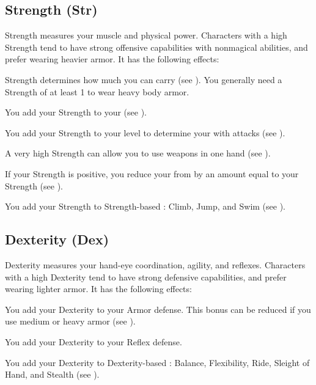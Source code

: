     \subsection{Strength (Str)}\label{Strength}
        {
            Strength measures your muscle and physical power.
            Characters with a high Strength tend to have strong offensive capabilities with nonmagical abilities, and prefer wearing heavier armor.
            It has the following effects:
            \begin{raggeditemize}
                \item Strength determines how much you can carry (see ).
                    You generally need a Strength of at least 1 to wear heavy body armor.
                \item You add your Strength to your  (see ).
                \item You add your Strength to your level to determine your  with  attacks (see ).
                \item A very high Strength can allow you to use  weapons in one hand (see ).
                \item If your Strength is positive, you reduce your  from  by an amount equal to your Strength (see ).
                \item You add your Strength to Strength-based : Climb, Jump, and Swim (see ).
            \end{raggeditemize}
        }

    \subsection{Dexterity (Dex)}\label{Dexterity}
        {
            Dexterity measures your hand-eye coordination, agility, and reflexes.
            Characters with a high Dexterity tend to have strong defensive capabilities, and prefer wearing lighter armor.
            It has the following effects:
            \begin{raggeditemize}
                \item You add your Dexterity to your Armor defense.
                    This bonus can be reduced if you use medium or heavy armor (see ).
                \item You add your Dexterity to your Reflex defense.
                \item You add your Dexterity to Dexterity-based : Balance, Flexibility, Ride, Sleight of Hand, and Stealth (see ).
            \end{raggeditemize}
        }

